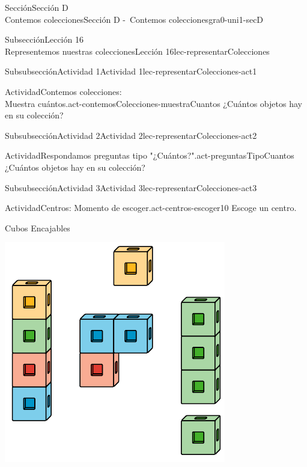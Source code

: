 \begin{sectionptx}{Sección}{{\Large Sección D\\}Contemos colecciones}{}{Sección D -~Contemos colecciones}{}{}{gra0-uni1-secD}
\begin{subsectionptx}{Subsección}{{\normalsize Lección 16\\[-0.05cm]}Representemos nuestras colecciones}{}{Lección 16}{}{}{lec-representarColecciones}
\begin{subsubsectionptx}{Subsubsección}{Actividad 1}{}{Actividad 1}{}{}{lec-representarColecciones-act1}
\begin{activity}{Actividad}{Contemos colecciones:\\Muestra cuántos.}{act-contemosColecciones-muestraCuantos}
¿Cuántos objetos hay en su colección?%
\end{activity}%
\end{subsubsectionptx}
%
%
\typeout{************************************************}
\typeout{************************************************}
%
\begin{subsubsectionptx}{Subsubsección}{Actividad 2}{}{Actividad 2}{}{}{lec-representarColecciones-act2}
\begin{activity}{Actividad}{Respondamos preguntas tipo "¿Cuántos?".}{act-preguntasTipoCuantos}%
¿Cuántos objetos hay en su colección?%
\end{activity}%
\end{subsubsectionptx}
%
%
\typeout{************************************************}
\typeout{************************************************}
%
\begin{subsubsectionptx}{Subsubsección}{Actividad 3}{}{Actividad 3}{}{}{lec-representarColecciones-act3}
\begin{activity}{Actividad}{Centros: Momento de escoger.}{act-centros-escoger10}%
Escoge un centro.%
\begin{sidebyside}{2}{0.025}{0.025}{0.05}%
\begin{sbspanel}{0.45}%
Cubos Encajables%
\par
\includegraphics[max width=\linewidth, center]{external/svg-source/tikz-file-128850.pdf}

\end{sbspanel}
\end{sidebyside}
\end{activity}
\end{subsubsectionptx}
\end{subsectionptx}
\end{sectionptx}
